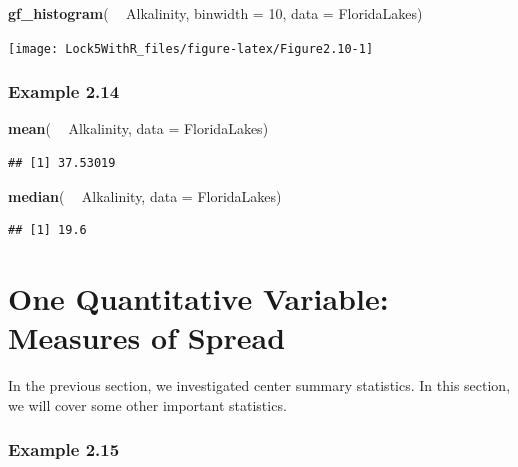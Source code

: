 \documentclass[]{book}
\newenvironment{Shaded}{\begin{snugshade}}{\end{snugshade}}
\newcommand{\DataTypeTok}[1]{\textcolor[rgb]{0.13,0.29,0.53}{#1}}
\newcommand{\DecValTok}[1]{\textcolor[rgb]{0.00,0.00,0.81}{#1}}
\newcommand{\KeywordTok}[1]{\textcolor[rgb]{0.13,0.29,0.53}{\textbf{#1}}}
\newcommand{\NormalTok}[1]{#1}
\newcommand{\OperatorTok}[1]{\textcolor[rgb]{0.81,0.36,0.00}{\textbf{#1}}}
\newcommand{\StringTok}[1]{\textcolor[rgb]{0.31,0.60,0.02}{#1}}
\begin{document}
\begin{Shaded}
\begin{Highlighting}[]
\KeywordTok{gf_histogram}\NormalTok{( }\OperatorTok{~}\StringTok{ }\NormalTok{Alkalinity, }\DataTypeTok{binwidth =} \DecValTok{10}\NormalTok{, }\DataTypeTok{data =}\NormalTok{ FloridaLakes)}
\end{Highlighting}
\end{Shaded}

\texttt{[image: Lock5WithR\_files/figure-latex/Figure2.10-1]}

\hypertarget{example-2.14}{%
\subsubsection{Example 2.14}\label{example-2.14}}

\begin{Shaded}
\begin{Highlighting}[]
\KeywordTok{mean}\NormalTok{( }\OperatorTok{~}\StringTok{ }\NormalTok{Alkalinity, }\DataTypeTok{data =}\NormalTok{ FloridaLakes)}
\end{Highlighting}
\end{Shaded}

\begin{verbatim}
## [1] 37.53019
\end{verbatim}

\begin{Shaded}
\begin{Highlighting}[]
\KeywordTok{median}\NormalTok{( }\OperatorTok{~}\StringTok{ }\NormalTok{Alkalinity, }\DataTypeTok{data =}\NormalTok{ FloridaLakes)}
\end{Highlighting}
\end{Shaded}

\begin{verbatim}
## [1] 19.6
\end{verbatim}

\hypertarget{one-quantitative-variable-measures-of-spread}{%
\section{One Quantitative Variable: Measures of Spread}\label{one-quantitative-variable-measures-of-spread}}

In the previous section, we investigated center summary statistics. In this section, we will cover some other important statistics.

\hypertarget{example-2.15}{%
\subsubsection{Example 2.15}\label{example-2.15}}
\end{document}
